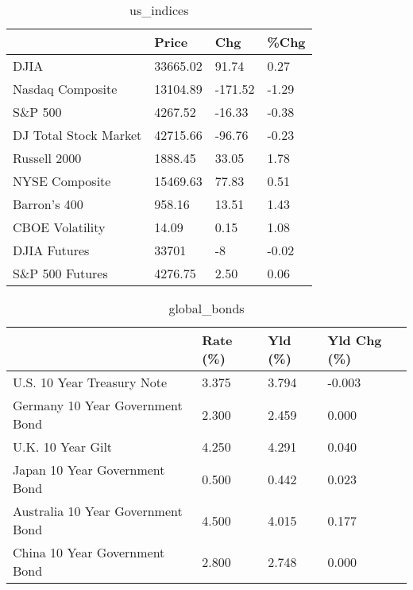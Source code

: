 \documentclass{article}%
\begin{document}
%


\begin{table}[htbp]%
\caption{us\_indices}%
\centering%
\begin{adjustbox}{width=1\textwidth}%
\begin{tabular}{llll}
\toprule
                      &    Price &     Chg &  \%Chg \\
\midrule
                 DJIA & 33665.02 &   91.74 &  0.27 \\
     Nasdaq Composite & 13104.89 & -171.52 & -1.29 \\
              S\&P 500 &  4267.52 &  -16.33 & -0.38 \\
DJ Total Stock Market & 42715.66 &  -96.76 & -0.23 \\
         Russell 2000 &  1888.45 &   33.05 &  1.78 \\
       NYSE Composite & 15469.63 &   77.83 &  0.51 \\
         Barron's 400 &   958.16 &   13.51 &  1.43 \\
      CBOE Volatility &    14.09 &    0.15 &  1.08 \\
         DJIA Futures &    33701 &      -8 & -0.02 \\
      S\&P 500 Futures &  4276.75 &    2.50 &  0.06 \\
\bottomrule
\end{tabular}
%
\end{adjustbox}%
\end{table}

%


\begin{table}[htbp]%
\caption{global\_bonds}%
\centering%
\begin{adjustbox}{width=1\textwidth}%
\begin{tabular}{llll}
\toprule
                                  & Rate (\%) & Yld (\%) & Yld Chg (\%) \\
\midrule
       U.S. 10 Year Treasury Note &    3.375 &   3.794 &      -0.003 \\
  Germany 10 Year Government Bond &    2.300 &   2.459 &       0.000 \\
                U.K. 10 Year Gilt &    4.250 &   4.291 &       0.040 \\
    Japan 10 Year Government Bond &    0.500 &   0.442 &       0.023 \\
Australia 10 Year Government Bond &    4.500 &   4.015 &       0.177 \\
    China 10 Year Government Bond &    2.800 &   2.748 &       0.000 \\
\bottomrule
\end{tabular}
%
\end{adjustbox}%
\end{table}
\end{document}
